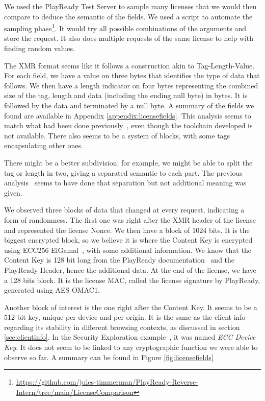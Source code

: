 \documentclass[11pt, a4paper]{IEEEtran}
\begin{document}
We used the PlayReady Test Server to sample many licenses that we would then compare to deduce the semantic of the fields. We used a script to automate the sampling phase\footnote{\url{https://github.com/jules-timmerman/PlayReady-Reverse-Intern/tree/main/LicenseComparison}}. It would try all possible combinations of the arguments and store the request. It also does multiple requests of the same license to help with finding random values.

The XMR format seems like it follows a construction akin to Tag-Length-Value. For each field, we have a value on three bytes that identifies the type of data that follows. We then have a length indicator on four bytes representing the combined size of the tag, length  and data (including the ending null byte) in bytes. It is followed by the data and terminated by a null byte. A summary of the fields we found are available in Appendix \ref{appendix:licensefields}. This analysis seems to match what had been done previously~\cite{securityexploration}, even though the toolchain developed is not available. There also seems to be a system of blocks, with some tags encapsulating other ones. 

There might be a better subdivision: for example, we might be able to split the tag or length in two, giving a separated semantic to each part. The previous analysis~\cite{securityexploration} seems to have done that separation but not additional meaning was given.

We observed three blocks of data that changed at every request, indicating a form of randomness. The first one was right after the XMR header of the license and represented the license Nonce. We then have a block of 1024 bits. It is the biggest encrypted block, so we believe it is where the Content Key is encrypted using ECC256 ElGamal~\cite{contentencryption}, with some additional information. We know that the Content Key is 128 bit long from the PlayReady documentation~\cite{contentencryption} and the PlayReady Header, hence the additional data. At the end of the license, we have a 128 bits block. It is the license MAC, called the license signature by PlayReady, generated using AES OMAC1.

Another block of interest is the one right after the Content Key. It seems to be a 512-bit key, unique per device and per origin. It is the same as the client info regarding its stability in different browsing contexts, as discussed in section \ref{sec:clientinfo}. In the Security Exploration example~\cite{securityexploration}, it was named \emph{ECC Device Key}. It does not seem to be linked to any cryptographic function we were able to observe so far. A summary can be found in Figure \ref{fig:licensefields}
\end{document}
